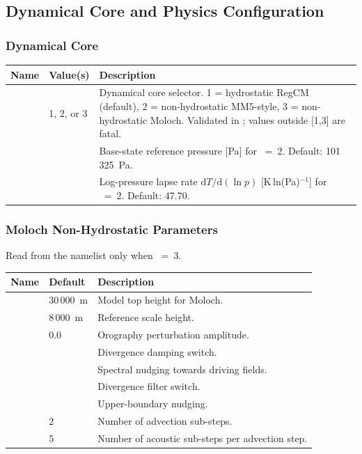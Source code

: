 \subsection{Dynamical Core and Physics Configuration}
\label{subsec:dynparam_core}

\subsubsection{Dynamical Core}

\begin{longtable}{L{3.5cm} L{3cm} L{7.5cm}}
  \toprule
  \textbf{Name} & \textbf{Value(s)} & \textbf{Description} \\
  \midrule
  \endhead
  \bottomrule
  \endfoot
   & 1, 2, or 3 &
    Dynamical core selector. 1 = hydrostatic RegCM (default), 2 = non-hydrostatic
    MM5-style, 3 = non-hydrostatic Moloch. Validated in ;
    values outside [1,3] are fatal. \\
   &  &
    Base-state reference pressure [Pa] for ~=~2.
    Default: 101\,325~Pa. \\
   &  &
    Log-pressure lapse rate $\mathrm{d}T/\mathrm{d}(\ln p)$ [K\,ln(Pa)$^{-1}$]
    for ~=~2. Default: 47.70. \\
\end{longtable}

\subsubsection{Moloch Non-Hydrostatic Parameters}

Read from the  namelist only when ~=~3.

\begin{longtable}{L{4cm} L{3cm} L{7cm}}
  \toprule
  \textbf{Name} & \textbf{Default} & \textbf{Description} \\
  \midrule
  \endhead
  \bottomrule
  \endfoot
             & 30\,000~m & Model top height for Moloch. \\
                & 8\,000~m  & Reference scale height. \\
               & 0.0       & Orography perturbation amplitude. \\
          &  & Divergence damping switch. \\
  &  & Spectral nudging towards driving fields. \\
        &  & Divergence filter switch. \\
       &  & Upper-boundary nudging. \\
             & 2  & Number of advection sub-steps. \\
           & 5  & Number of acoustic sub-steps per advection step. \\
\end{longtable}


